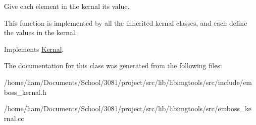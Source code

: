Give each element in the kernal it\textquotesingle{}s value. 

This function is implemented by all the inherited kernal classes, and each define the values in the kernal. 

Implements \hyperlink{classKernal_a487ef0e4a0d37cb827b5c46750330952}{Kernal}.



The documentation for this class was generated from the following files\+:\begin{DoxyCompactItemize}
\item 
/home/liam/\+Documents/\+School/3081/project/src/lib/libimgtools/src/include/emboss\+\_\+kernal.\+h\item 
/home/liam/\+Documents/\+School/3081/project/src/lib/libimgtools/src/emboss\+\_\+kernal.\+cc\end{DoxyCompactItemize}
